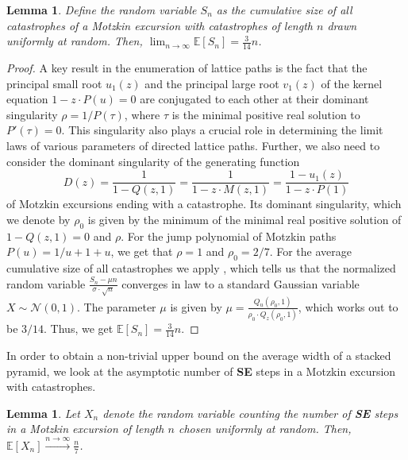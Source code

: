\documentclass{article}
\newtheorem{lemma}[theorem]{Lemma}
\theoremstyle{definition}
\begin{document}
\begin{lemma}
  \label{lem:cum_size}
    Define the random variable $S_n$ as the cumulative size of all catastrophes of a Motzkin excursion with catastrophes of length $n$ drawn uniformly at random.
    Then, $\lim_{ n \to \infty } \mathbb{E}[S_n] = \frac{3}{14}n$.
\end{lemma}

\begin{proof}
  A key result \cite{BasicLatticePaths} in the enumeration of lattice paths is the fact that the principal small root $u_1(z)$ and the principal large root $v_1(z)$ of the kernel equation $1 - z \cdot P(u) = 0$ are conjugated to each other at their dominant singularity $\rho = 1 / P(\tau)$, where $\tau$ is the minimal positive real solution to $P'(\tau) = 0$. This singularity also plays a crucial role in determining the limit laws of various parameters of directed lattice paths.
  Further, we also need to consider the dominant singularity of the generating function
  \[
    D(z) = \frac{1}{1 - Q(z,1)} = \frac{1}{1 - z \cdot M(z,1)} = \frac{1 - u_1(z)}{1 - z \cdot P(1)}
  \]
  of Motzkin excursions ending with a catastrophe.
  Its dominant singularity, which we denote by $\rho_0$ is given by the minimum of the minimal real positive solution of $1 - Q(z,1) = 0$ and $\rho$.
  For the jump polynomial of Motzkin paths $P(u) = 1/u + 1 + u$, we get that $\rho = 1$ and $\rho_0 = 2/7$.
  For the average cumulative size of all catastrophes we apply \cite[Theorem~4.18]{Catastrophes}, which tells us that the normalized random variable $\frac{S_n - \mu n}{\sigma \cdot \sqrt{ n }}$ converges in law to a standard Gaussian variable $X \sim \mathcal{N}(0,1)$.
  The parameter $\mu$ is given by $\mu = \frac{Q_u(\rho_0, 1)}{\rho_0 \cdot Q_z(\rho_0, 1)}$, which works out to be $3/14$.
  Thus, we get $\mathbb{E}[S_n] = \frac{3}{14} n$.
\end{proof}

In order to obtain a non-trivial upper bound on the average width of a stacked pyramid, we look at the asymptotic number of \textbf{SE} steps in a Motzkin excursion with catastrophes.

\begin{lemma}
  \label{lem:no-SE}
  Let $X_n$ denote the random variable counting the number of \textbf{SE} steps in a Motzkin excursion of length $n$ chosen uniformly at random.
  Then, $\mathbb{E}[X_n] \xrightarrow[]{{n \to \infty}} \frac{n}{7}$.
\end{lemma}
\end{document}
